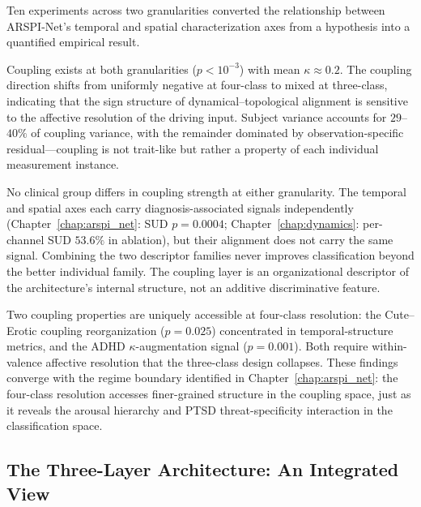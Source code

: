 Ten experiments across two granularities converted the relationship between ARSPI-Net's temporal and spatial characterization axes from a hypothesis into a quantified empirical result.

Coupling exists at both granularities ($p < 10^{-3}$) with mean $\kappa \approx 0.2$. The coupling direction shifts from uniformly negative at four-class to mixed at three-class, indicating that the sign structure of dynamical--topological alignment is sensitive to the affective resolution of the driving input. Subject variance accounts for $29$--$40\%$ of coupling variance, with the remainder dominated by observation-specific residual---coupling is not trait-like but rather a property of each individual measurement instance.

No clinical group differs in coupling strength at either granularity. The temporal and spatial axes each carry diagnosis-associated signals independently (Chapter~\ref{chap:arspi_net}: SUD $p = 0.0004$; Chapter~\ref{chap:dynamics}: per-channel SUD $53.6\%$ in ablation), but their alignment does not carry the same signal. Combining the two descriptor families never improves classification beyond the better individual family. The coupling layer is an organizational descriptor of the architecture's internal structure, not an additive discriminative feature.

Two coupling properties are uniquely accessible at four-class resolution: the Cute--Erotic coupling reorganization ($p = 0.025$) concentrated in temporal-structure metrics, and the ADHD $\kappa$-augmentation signal ($p = 0.001$). Both require within-valence affective resolution that the three-class design collapses. These findings converge with the regime boundary identified in Chapter~\ref{chap:arspi_net}: the four-class resolution accesses finer-grained structure in the coupling space, just as it reveals the arousal hierarchy and PTSD threat-specificity interaction in the classification space.

\subsection{The Three-Layer Architecture: An Integrated View}

